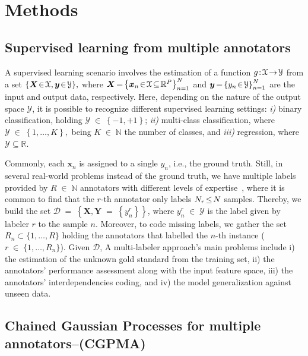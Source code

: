 \documentclass[journal]{IEEEtran}
\providecommand{\ve}[1]{{\bm{#1}}}%
\providecommand{\mat}[1]{{\bm{#1}}} %
\newcommand{\Real}{\mathbb{R}}
\DeclareMathOperator{\en}{\!\,\in\!\,}
\DeclareMathOperator{\igual}{\!\,=\!\,}
\providecommand{\s}[1]{\negthinspace#1\negthinspace}%
\providecommand{\ve}[1]{{\mathbf{#1}}}
\providecommand{\mat}[1]{{\mathbf{#1}}}
\begin{document}
\section{Methods}\label{sec:methods}

\subsection{Supervised learning from multiple annotators}
A supervised learning scenario involves the estimation of a function $g\s{:}\mathcal{X}\s{\to}\mathcal{Y}$ from a set $\{\ve{X}\s{\in}\mathcal{X},\ve{y}\s{\in}\mathcal{Y}\},$ where $\mat{X}\igual \left\{\ve{x}_n\s{\in}\mathcal{X}\!\subseteq\!\Real^P\right\}_{n=1}^{N}$ and $\mat{y}\igual\left\{y_n\s{\in} \mathcal{Y}\right\}_{n=1}^{N}$ are the input and output data, respectively. Here, depending on the nature of the output space $\mathcal{Y}$, it is possible to recognize different supervised learning settings: \textit{i)} binary classification, holding $\mathcal{Y}\en \left\{-1,+1\right\}$; \textit{ii)} multi-class classification, where $\mathcal{Y}\en \left\{1,\dots, K\right\},$ being $K\en\mathbb{N}$ the number of classes, and \textit{iii)} regression, where $\mathcal{Y}\subseteq \Real$.

Commonly, each $\ve{x}_n$ is assigned to a single $y_n$, i.e., the ground truth. Still, in several real-world problems instead of the ground truth, we have multiple labels provided by $R \en\mathbb{N}$ annotators with different levels of expertise~\cite{raykar2010learning}, where it is common to find that the $r$-th annotator only labels $N_r\s{\le}N$ samples. Thereby, we build the set $\mathcal{D} \igual \left\{\mat{X}, \mat{Y} \igual \left\{y_n^r\right\}\right\}$, where $y_n^r\en \mathcal{Y}$ is the label given by labeler $r$ to the sample $n$. Moreover, to code missing  labels, we gather the set $R_n\subset \{1, \dots, R\}$ holding the annotators that labelled the $n$-th instance ($r\en\{1,\dots,R_n\}$). Given $\mathcal{D}$, A multi-labeler approach's main problems include i) the estimation of the unknown gold standard from the training set, ii) the annotators' performance assessment along with the input feature space, iii) the annotators' interdependencies coding, and iv) the model generalization against unseen data. 
 
\subsection{Chained Gaussian Processes for multiple annotators--(CGPMA)}\label{sec:CGP}
\end{document}
